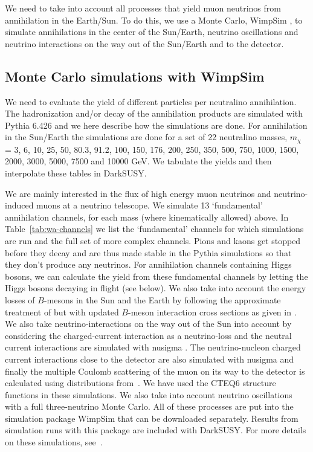 \documentclass[a4paper,10pt,oneside]{book}
\newcommand{\code}[1]{\ft{#1}}
\newcommand{\ds}{{\sffamily DarkSUSY}}
\newcommand{\ft}[1]{\textsf{#1}}
\begin{document}
We need to take into account all processes that yield muon neutrinos from
annihilation in the Earth/Sun. To do this, we use a Monte Carlo, WimpSim \cite{Edsjo:2007ws}, to simulate
annihilations in the center of the Sun/Earth, neutrino oscillations and neutrino interactions on the way out of the Sun/Earth and to the detector.

\subsection{Monte Carlo simulations with WimpSim}
\label{sec:nt-mcsim}

We need to
evaluate the yield of different particles per neutralino annihilation.
The hadronization and/or decay of the annihilation products are
simulated with {\sc Pythia} \cite{Sjostrand:2006za} 6.426
and we here describe how the simulations are done.
For annihilation in the Sun/Earth 
the simulations are done for a set of 22 neutralino
masses, $m_{\chi}$ = 3, 6, 10, 25, 50, 80.3, 91.2, 100, 150, 176, 200, 250,
350, 500, 750, 1000, 1500, 2000, 3000, 5000, 7500 and 10000 GeV\@.
We tabulate the yields and then interpolate these tables in \ds.

We are mainly interested in the flux of high energy muon neutrinos
     and neutrino-induced muons at a neutrino telescope.  We simulate 13
     `fundamental' annihilation channels,      
for each mass
     (where kinematically allowed) above. In Table~\ref{tab:wa-channels} we list the `fundamental' channels for which simulations are run and the full set of more complex channels.
     Pions and kaons get stopped
     before they decay and are thus made stable in the {\sc Pythia}
     simulations so that they don't produce any neutrinos.  For
     annihilation channels containing Higgs bosons, we can calculate
     the yield from these fundamental channels by letting the Higgs
     bosons decaying in flight (see below).  We also take into account
     the energy losses of $B$-mesons in the Sun and the Earth by
     following the approximate treatment of \cite{Ritz:1987mh} but with updated
     $B$-meson interaction cross sections as given in
     \cite{Edsjo:1997hp}.  We also take neutrino-interactions on the
     way out of the Sun into account by considering the charged-current
     interaction as a neutrino-loss and the neutral current
     interactions are simulated with \code{nusigma} \cite{Edsjo:2007ns}.  The
     neutrino-nucleon charged current interactions close to the
     detector are also simulated with \code{nusigma} and finally the
     multiple Coulomb scattering of the muon on its way to the detector
     is calculated using distributions from~\cite{Groom:2000in}. We have used the CTEQ6
     structure functions in these simulations.
     We also take into account neutrino oscillations with a full three-neutrino Monte Carlo. All of these processes are put into the simulation package \code{WimpSim} \cite{Edsjo:2007ws} that can be downloaded separately. Results from simulation runs with this package are included with \ds.
     For more details on these simulations, see~\cite{Blennow:2007tw}.
     
\end{document}

